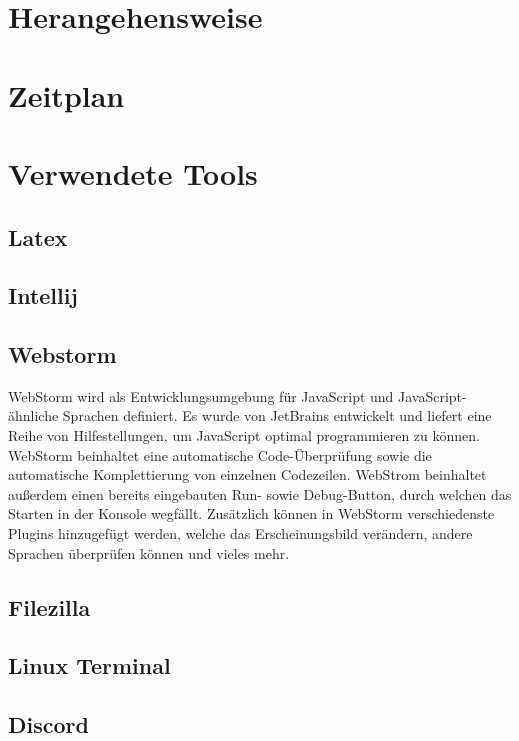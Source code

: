 \section{Herangehensweise}
 
 
\section{Zeitplan}
 
 
\section{Verwendete Tools}
 
 
 
\subsection{Latex}
\subsection{Intellij}
 
\subsection{Webstorm}
WebStorm wird als Entwicklungsumgebung für JavaScript und JavaScript-ähnliche Sprachen definiert. Es wurde von JetBrains entwickelt und liefert eine Reihe von Hilfestellungen, um JavaScript optimal programmieren zu können. WebStorm beinhaltet eine automatische Code-Überprüfung sowie die automatische Komplettierung von einzelnen Codezeilen. WebStrom beinhaltet außerdem einen bereits eingebauten Run- sowie Debug-Button, durch welchen das Starten in der Konsole wegfällt. Zusätzlich können in WebStorm verschiedenste Plugins hinzugefügt werden, welche das Erscheinungsbild verändern, andere Sprachen überprüfen können und vieles mehr.
 
\subsection{Filezilla}
\subsection{Linux Terminal}
\subsection{Discord}
